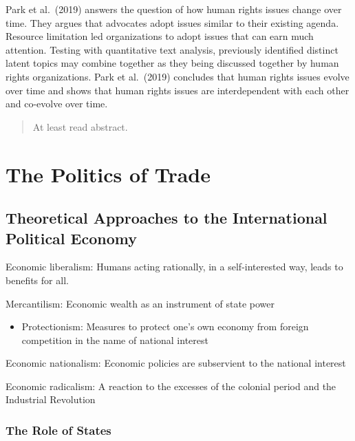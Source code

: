 \documentclass[
]{book}
\providecommand{\tightlist}{%
  \setlength{\itemsep}{0pt}\setlength{\parskip}{0pt}}
\begin{document}
Park et al.~(2019) answers the question of how human rights issues change over time. They argues that advocates adopt issues similar to their existing agenda. Resource limitation led organizations to adopt issues that can earn much attention. Testing with quantitative text analysis, previously identified distinct latent topics may combine together as they being discussed together by human rights organizations. Park et al.~(2019) concludes that human rights issues evolve over time and shows that human rights issues are interdependent with each other and co-evolve over time.

\begin{quote}
At least read abstract.
\end{quote}

\hypertarget{the-politics-of-trade}{%
\chapter{The Politics of Trade}\label{the-politics-of-trade}}

\hypertarget{theoretical-approaches-to-the-international-political-economy}{%
\section{Theoretical Approaches to the International Political Economy}\label{theoretical-approaches-to-the-international-political-economy}}

Economic liberalism: Humans acting rationally, in a self-interested way, leads to benefits for all.

Mercantilism: Economic wealth as an instrument of state power

\begin{itemize}
\tightlist
\item
  Protectionism: Measures to protect one's own economy from foreign competition in the name of national interest
\end{itemize}

Economic nationalism: Economic policies are subservient to the national interest

Economic radicalism: A reaction to the excesses of the colonial period and the Industrial Revolution

\hypertarget{the-role-of-states}{%
\subsection{The Role of States}\label{the-role-of-states}}
\end{document}
